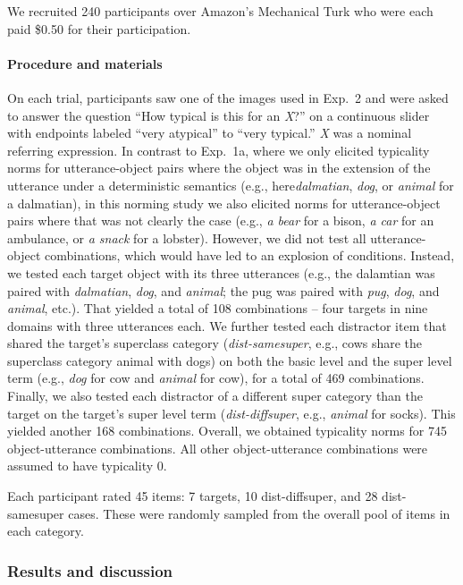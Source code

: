 \documentclass[11pt]{article}
\begin{document}
We recruited 240 participants over Amazon's Mechanical Turk who were each paid \$0.50 for their participation.

\paragraph{Procedure and materials}

On each trial, participants saw one of the images used in Exp.~2 and were asked to answer the question ``How typical is this for an \emph{X}?'' on a continuous slider with endpoints labeled ``very atypical'' to ``very typical.'' \emph{X} was a nominal referring expression. In contrast to Exp.~1a, where we only elicited typicality norms for utterance-object pairs where the object was in the extension of the utterance under a deterministic semantics (e.g., here\emph{dalmatian}, \emph{dog}, or \emph{animal} for a dalmatian), in this norming study we also elicited norms for utterance-object pairs where that was not clearly the case (e.g., \emph{a bear} for a bison, \emph{a car} for an ambulance, or \emph{a snack} for a lobster). However, we did not test all utterance-object combinations, which would have led to an explosion of conditions. Instead, we tested each target object with its three utterances (e.g., the dalamtian was paired with \emph{dalmatian}, \emph{dog}, and \emph{animal}; the pug was paired with \emph{pug}, \emph{dog}, and \emph{animal}, etc.). That yielded a total of 108 combinations -- four targets in nine domains with three utterances each. We further tested each distractor item that shared the target's superclass category (\emph{dist-samesuper}, e.g., cows share the superclass category animal with dogs) on both the basic level and the super level term (e.g., \emph{dog} for cow and \emph{animal} for cow), for a total of 469 combinations. Finally, we also tested each distractor of a different super category than the target on the target's super level term (\emph{dist-diffsuper}, e.g., \emph{animal} for socks). This yielded another 168 combinations. Overall, we obtained typicality norms for 745 object-utterance combinations. All other object-utterance combinations were assumed to have typicality 0.

Each participant rated 45 items: 7 targets, 10 dist-diffsuper, and 28 dist-samesuper cases. These were randomly sampled from the overall pool of items in each category. 

\subsubsection{Results and discussion}
\end{document}
